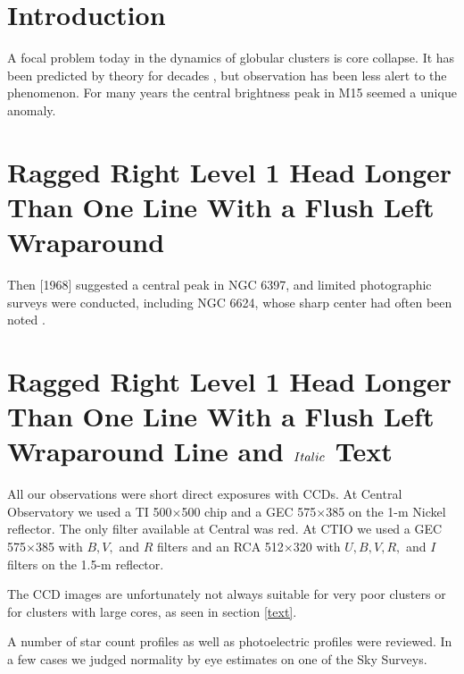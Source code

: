 \begin{article}
\section{Introduction}

   A focal problem today in the dynamics of globular 
clusters is core collapse.  It has been predicted by 
theory for decades \cite{baker77,barbour77,bell72}, but 
observation has been less alert to the phenomenon.  
For many years the central brightness peak in M15 
\cite{brosche77,yamazaki78} seemed a unique anomaly.

\section{Ragged Right Level 1 Head Longer Than One 
Line With a Flush Left Wraparound}

Then  [1968] suggested 
a central peak in NGC 6397, and limited photographic 
surveys were conducted, including NGC 6624, whose sharp center had 
often been noted \cite{namias74}.

\section{Ragged Right Level 1 Head Longer Than One Line 
With a Flush Left Wraparound Line and 
$\protect \boldmath Italic $ Text}
   All our observations were short direct exposures with CCDs.  
At Central Observatory we used a TI 500$\times$500 chip and a 
GEC 575$\times$385 on the 1-m Nickel reflector.  The only 
filter available at Central was red.  At CTIO we used a GEC 
575$\times$385 with $B, V,$ and $R$ filters and an RCA 
512$\times$320 with $U, B, V, R,$ and $I$ filters on the 
1.5-m reflector.  

   The CCD images are unfortunately not always suitable 
for very poor clusters or for clusters with large cores, 
as seen in section \ref{text}.  

A number of star count profiles \cite{poppe95} as well 
as photoelectric profiles 
\cite{mcmullen78} were reviewed.  In a 
few cases we judged normality by eye estimates on one 
of the Sky Surveys. 



\end{article}
